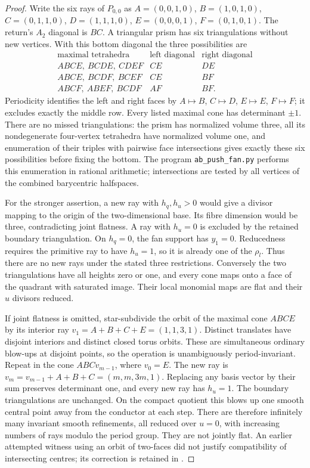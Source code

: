 \begin{proof}
Write the six rays of $P_{0,0}$ as
$A=(0,0,1,0)$, $B=(1,0,1,0)$, $C=(0,1,1,0)$,
$D=(1,1,1,0)$, $E=(0,0,0,1)$, $F=(0,1,0,1)$.
The return's $A_2$ diagonal is $BC$. A triangular prism has six
triangulations without new vertices. With this bottom diagonal
the three possibilities are
\[
\begin{array}{c|c|c}
\text{maximal tetrahedra}&\text{left diagonal}&\text{right diagonal}\\\hline
ABCE,\ BCDE,\ CDEF&CE&DE\\
ABCE,\ BCDF,\ BCEF&CE&BF\\
ABCF,\ ABEF,\ BCDF&AF&BF.
\end{array}
\]
Periodicity identifies the left and right faces by $A\mapsto B$,
$C\mapsto D$, $E\mapsto E$, $F\mapsto F$; it excludes exactly
the middle row. Every listed maximal cone has determinant $\pm1$.
There are no missed triangulations: the prism has normalized volume
three, all its nondegenerate four-vertex tetrahedra have normalized
volume one, and enumeration of their triples with pairwise
face intersections gives exactly these six possibilities before
fixing the bottom. The program \texttt{ab\_push\_fan.py} performs
this enumeration in rational arithmetic; intersections are tested
by all vertices of the combined barycentric halfspaces.

For the stronger assertion, a new ray with $h_q,h_u>0$ would
give a divisor mapping to the origin of the two-dimensional base.
Its fibre dimension would be three, contradicting joint flatness.
A ray with $h_u=0$ is excluded by the retained boundary
triangulation. On $h_q=0$, the fan support has $y_1=0$.
Reducedness requires the primitive ray to have $h_u=1$, so it
is already one of the $\rho_l$. Thus there are no new rays under
the stated three restrictions. Conversely the two triangulations
have all heights zero or one, and every cone maps onto a face of
the quadrant with saturated image. Their local monomial maps
are flat and their $u$ divisors reduced.

If joint flatness is omitted, star-subdivide the orbit of the
maximal cone $ABCE$ by its interior ray
$v_1=A+B+C+E=(1,1,3,1)$. Distinct translates have disjoint
interiors and distinct closed torus orbits. These are simultaneous
ordinary blow-ups at disjoint points, so the operation is
unambiguously period-invariant. Repeat in the cone $ABCv_{m-1}$,
where $v_0=E$. The new ray is
$v_m=v_{m-1}+A+B+C=(m,m,3m,1)$. Replacing any basis vector
by their sum preserves determinant one, and every new ray has
$h_u=1$. The boundary triangulations are unchanged. On the
compact quotient this blows up one smooth central point away
from the conductor at each step. There are therefore infinitely
many invariant smooth refinements, all reduced over $u=0$, with
increasing numbers of rays modulo the period group. They are
not jointly flat. An earlier attempted witness using an orbit
of two-faces did not justify compatibility of intersecting
centres; its correction is retained in
.
\end{proof}

